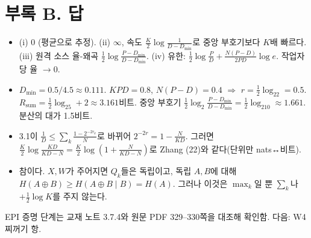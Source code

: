 \section*{부록 B. 답}
\begin{itemize}[leftmargin=2.2em]
\item[3.6] (i) $0$ (평균으로 추정). (ii) $\infty$, 속도 $\frac K2\log\frac1{D-D_{\min}}$로 중앙 부호기보다 $K$배 빠르다. (iii) 원격 소스 율-왜곡 $\frac12\log\frac{P-D_{\min}}{D-D_{\min}}$. (iv) 유한: $\frac12\log\frac PD+\frac{N(P-D)}{2PD}\log e$. 작업자당 율 $\to0$.
\item[3.7] $D_{\min}=0.5/4.5\approx0.111$. $KPD=0.8$, $N(P-D)=0.4$ $\Rightarrow$ $r=\frac12\log_22=0.5$. $R_{\mathrm{sum}}=\frac12\log_25+2\approx3.161$비트. 중앙 부호기 $\frac12\log_2\frac{P-D_{\min}}{D-D_{\min}}=\frac12\log_210\approx1.661$. 분산의 대가 1.5비트.
\item[4.1(ii)] 3.1이 $\frac1D\le\sum_k\frac{1-2^{-2r_k}}N$로 바뀌어 $2^{-2r}=1-\frac N{KD}$. 그러면 $\frac K2\log\frac{KD}{KD-N}=\frac K2\log(1+\frac N{KD-N})$로 Zhang (22)와 같다(단위만 nats↔비트).
\item[5.2] 참이다. $X,W$가 주어지면 $Q_k$들은 독립이고, 독립 $A,B$에 대해 $H(A\oplus B)\ge H(A\oplus B\mid B)=H(A)$. 그러나 이것은 $\max_k$일 뿐 $\sum_k$나 $+\frac12\log K$를 주지 않는다.
\end{itemize}
\vspace{1em}
\small\textcolor{ink!60}{EPI 증명 단계는 교재 노트 3.7.4와 원문 PDF 329–330쪽을 대조해 확인함. 다음: W4 찌꺼기 항.}

